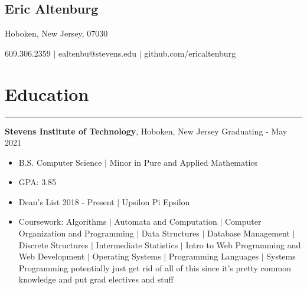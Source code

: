 \documentclass[10pt]{article}
\newcommand{\name}[1]{\begin{center}\section*{\huge #1}\end{center}}
\newcommand{\topinfo}[1]{\begin{center}\vspace{-0.15cm}#1\vspace{-0.15cm}\end{center}}
\newcommand{\resumesection}[1]{\vspace{-0.2cm}\section*{#1}\vspace{-0.2cm}\hrule\vspace{0.2cm}}
\begin{document}
\name{Eric Altenburg}
\topinfo{Hoboken, New Jersey, 07030}

\topinfo{609.306.2359 $\vert$ ealtenbu@stevens.edu $\vert$ github.com/ericaltenburg}








\resumesection{Education}
\textbf{Stevens Institute of Technology}, Hoboken, New Jersey \hfill Graduating - May 2021
\begin{itemize}
	\item B.S. Computer Science $\vert$ Minor in Pure and Applied Mathematics
	\item GPA: 3.85 
	\item Dean's List 2018 - Present $\vert$ Upsilon Pi Epsilon 
	\item Coursework: Algorithms $\vert$ Automata and Computation $\vert$ Computer Organization and Programming $\vert$ Data Structures $\vert$ Database Management $\vert$ Discrete Structures $\vert$ Intermediate Statistics $\vert$ Intro to Web Programming and Web Development $\vert$ Operating Systems $\vert$ Programming Languages $\vert$ Systems Programming
	potentially just get rid of all of this since it's pretty common knowledge and put grad electives and stuff
\end{itemize}
\end{document}
